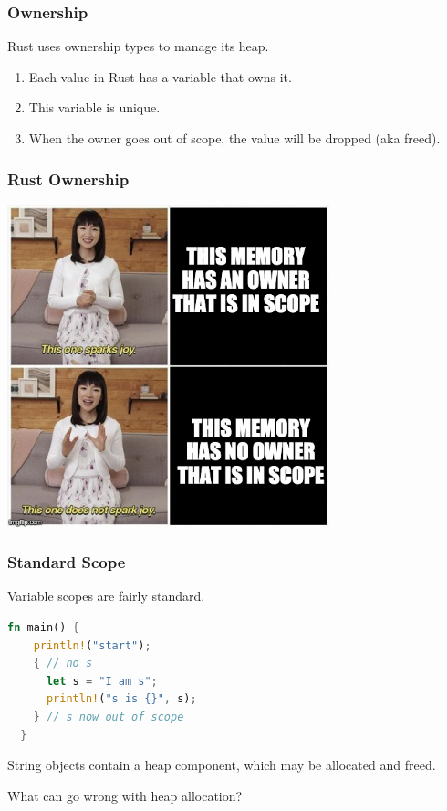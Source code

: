 \begin{frame}
\frametitle{Ownership}
Rust uses ownership types to manage its heap. 

\begin{enumerate}[noitemsep]
\item Each value in Rust has a variable that \alert{owns} it.
\item This variable is \alert{unique}.
\item When the owner goes out of scope, the value will be dropped (aka freed).
\end{enumerate}


\end{frame}


\begin{frame}
\frametitle{Rust Ownership}

\begin{center}
	\includegraphics[width=0.7\textwidth]{images/joy.jpeg}
\end{center}

\end{frame}



\begin{frame}[fragile]
\frametitle{Standard Scope}

Variable scopes are fairly standard.
\begin{lstlisting}[language=Rust]
  fn main() {
    println!("start");
    { // no s
      let s = "I am s";
      println!("s is {}", s);
    } // s now out of scope
  }
\end{lstlisting}

 String objects contain a heap component,
which may be allocated and freed.

What can go wrong with heap allocation?

\end{frame}


